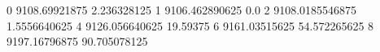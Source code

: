 0 9108.69921875 2.236328125
1 9106.462890625 0.0
2 9108.0185546875 1.5556640625
4 9126.056640625 19.59375
6 9161.03515625 54.572265625
8 9197.16796875 90.705078125
